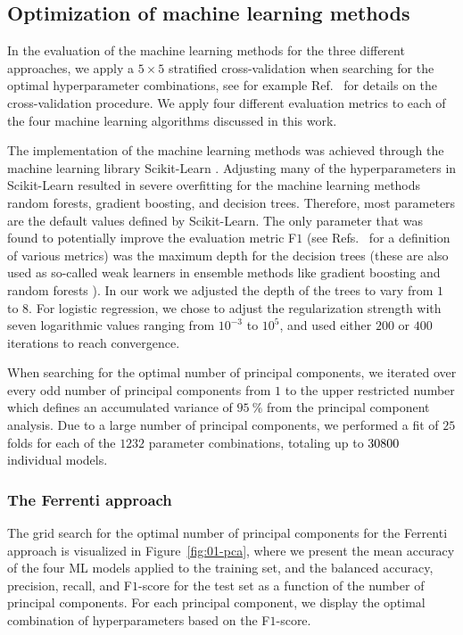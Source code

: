 \documentclass[superscriptaddress,unsortedaddress,
 amsmath,amssymb,
 aps,
]{revtex4-2}
\newcommand{\mrk}[1]{\textcolor{black}{#1}}
\begin{document}
\subsection*{Optimization of machine learning methods}

In the evaluation of the machine learning methods for the three different approaches, we apply a $5\times 5$ stratified cross-validation when searching for the optimal hyperparameter combinations, see for example Ref.~\cite{Hastie2009} for details on the cross-validation procedure. We apply four different evaluation metrics to each of the four machine learning algorithms discussed in this work. 

The implementation of the machine learning methods was achieved through the machine learning library Scikit-Learn \cite{Pedregosa2012}. Adjusting many of the hyperparameters in Scikit-Learn resulted in severe overfitting for the machine learning methods random forests, gradient boosting, and decision trees. Therefore, most parameters are the default values defined by Scikit-Learn. The only parameter that was found to potentially improve the evaluation metric F$1$  (see Refs.~\cite{sammut2010,geron2022} for a definition of various metrics) was the maximum depth for the decision trees (these are also used as so-called weak learners in ensemble methods like gradient boosting and random forests \cite{geron2022}). In our work we adjusted 
the depth of the trees to vary from $1$ to $8$. For logistic regression, we chose to adjust the regularization strength with seven logarithmic values ranging from $10^{-3}$ to $10^{5}$, and used either $200$ or $400$ iterations to reach convergence. 

When searching for the optimal number of principal components, we iterated over every odd number of principal components from $1$ to the upper restricted number which defines an accumulated variance of $95 \ \%$ from the principal component analysis. Due to a large number of principal components, we performed a fit of  $25$ folds for each of the $1232$ parameter combinations, totaling up to \mrk{\num{30800}} individual models. 


\subsubsection*{The Ferrenti approach}
The grid search for the optimal number of principal components for the Ferrenti approach is visualized in Figure~\ref{fig:01-pca}, where we present the mean accuracy of the four ML models applied to the training set, and the balanced accuracy, precision, recall, and F$1$-score for the test set as a function of the number of principal components. For each principal component, we display the optimal combination of  hyperparameters based on the F$1$-score. 
\end{document}
